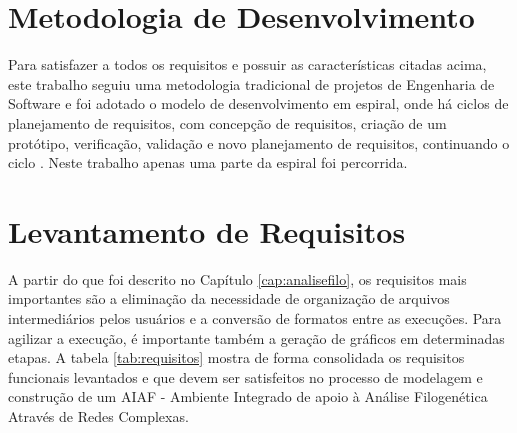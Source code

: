 
\section{Metodologia de Desenvolvimento}

Para satisfazer a todos os requisitos e possuir as características citadas acima, este trabalho seguiu uma metodologia tradicional de projetos
de Engenharia de Software \cite{softeng2005} e foi adotado o modelo de desenvolvimento em espiral, onde há ciclos de planejamento de requisitos,
com concepção de requisitos, criação
de um protótipo, verificação, validação e novo planejamento de requisitos, continuando o ciclo \cite{boehm1986}. Neste trabalho apenas uma
parte da espiral foi percorrida.

\section{Levantamento de Requisitos}

A partir do que foi descrito no Capítulo \ref{cap:analisefilo}, os requisitos mais importantes são a eliminação da necessidade de organização de arquivos
intermediários pelos usuários e a conversão de formatos entre as execuções. Para agilizar a execução, é importante também a geração de gráficos em
determinadas etapas. A tabela \ref{tab:requisitos} mostra de forma consolidada os requisitos funcionais levantados e que devem ser satisfeitos no processo de
modelagem e construção de um AIAF -
Ambiente Integrado de apoio à Análise Filogenética
Através de Redes Complexas.


